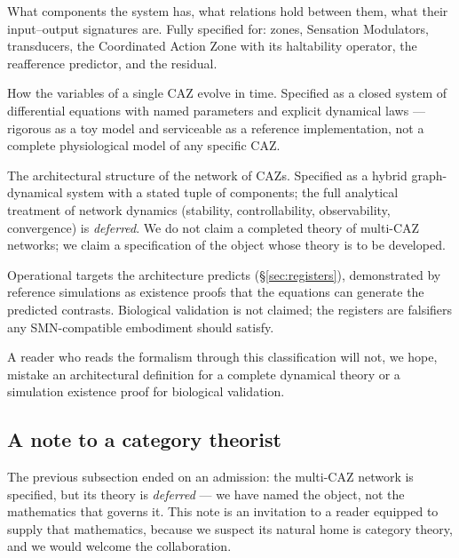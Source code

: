 \documentclass{article}
\begin{document}
\begin{description}[itemsep=4pt,labelindent=0pt,leftmargin=2em,
                    style=nextline]
\item[Architectural definitions]
What components the system has, what relations hold between them, what
their input--output signatures are.  Fully specified for: zones,
Sensation Modulators, transducers, the Coordinated Action Zone with its
haltability operator, the reafference predictor, and the residual.
\item[Single-CAZ dynamics]
How the variables of a single CAZ evolve in time.  Specified as a closed
system of differential equations with named parameters and explicit
dynamical laws --- rigorous as a toy model and serviceable as a reference
implementation, not a complete physiological model of any specific CAZ.
\item[Multi-CAZ network specification]
The architectural structure of the network of CAZs.  Specified as a
hybrid graph-dynamical system with a stated tuple of components; the full
analytical treatment of network dynamics (stability, controllability,
observability, convergence) is \emph{deferred}.  We do not claim a
completed theory of multi-CAZ networks; we claim a specification of the
object whose theory is to be developed.
\item[Empirical registers]
Operational targets the architecture predicts (\S\ref{sec:registers}),
demonstrated by reference simulations as existence proofs that the
equations can generate the predicted contrasts.  Biological validation is
not claimed; the registers are falsifiers any SMN-compatible embodiment
should satisfy.
\end{description}

\noindent
A reader who reads the formalism through this classification will not, we
hope, mistake an architectural definition for a complete dynamical theory
or a simulation existence proof for biological validation.

\subsection{A note to a category theorist}\label{app:category-theory}

The previous subsection ended on an admission: the multi-CAZ network is specified,
but its theory is \emph{deferred} --- we have named the object, not the mathematics
that governs it.  This note is an invitation to a reader equipped to supply that
mathematics, because we suspect its natural home is category theory, and we would
welcome the collaboration.
\end{document}
